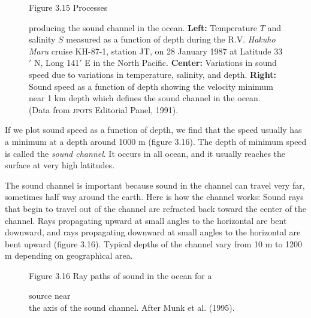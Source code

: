 \begin{figure}[t!]
\footnotesize
Figure 3.15 Processes \rule{0pt}{4ex}producing the sound
channel in the ocean.  \textbf{Left:} Temperature
$T$ and salinity $S$ measured as a function of depth during the R.V.
\textit{Hakuho Maru} cruise KH-87-1, station JT, on 28 January 1987 at
Latitude 33$'$ N, Long 141$'$ E in the
North Pacific.  \textbf{Center:} Variations in sound
speed due to variations in
temperature, salinity, and depth. \textbf{Right:} Sound
speed as a function of depth
showing the velocity minimum near 1 km depth which defines the sound
channel in the ocean. (Data from \textsc{jpots}
Editorial Panel, 1991).
\label{fig:soundprofile}
\vspace{-3ex}
\end{figure}

If we plot sound speed as a
function of depth, we find that the speed usually has a minimum at a
depth around 1000 m (figure 3.16). The depth of minimum speed is
called the \textit{sound channel}. It
occurs in all ocean, and it usually reaches the surface at very high
latitudes.

The sound channel is important because sound in
the channel can travel very far, sometimes half way around the
earth. Here is how the channel works: Sound rays
that begin to travel out of the channel are refracted back toward the
center of the channel. Rays propagating upward at small angles to the
horizontal are bent downward, and rays propagating downward at small
angles to the horizontal are bent upward (figure 3.16). Typical depths
of the chan\-nel vary from 10 m to 1200 m depending on geographical
area.

\begin{figure}[t!]
\footnotesize
\centering
Figure 3.16 Ray paths of sound in the ocean for a
\rule{0pt}{3ex}source near\\the axis of the sound channel. After Munk
et al. (1995).

\label{fig:raypaths}
\vspace{-3ex}
\end{figure}

